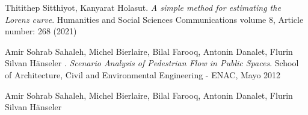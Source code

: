 \documentclass[12pt]{amsart}
\begin{document}
\begin{thebibliography}{99}
Thitithep Sitthiyot, Kanyarat Holasut. \emph{A simple method for estimating the Lorenz curve}.
		Humanities and Social Sciences Communications volume 8, Article number: 268 (2021)

Amir Sohrab Sahaleh, Michel Bierlaire, Bilal Farooq, Antonin Danalet, Flurin Silvan Hänseler . \emph{Scenario Analysis of Pedestrian Flow in Public Spaces}.
		School of Architecture, Civil and Environmental Engineering - ENAC, Mayo 2012

Amir Sohrab Sahaleh, Michel Bierlaire, Bilal Farooq, Antonin Danalet, Flurin Silvan Hänseler 

\end{thebibliography}
\smallskip
\smallskip
\end{document}
